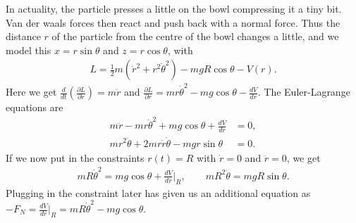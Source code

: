 In actuality, the particle presses a little on the bowl compressing it a tiny bit. Van der waals forces then react and push back with a normal force. Thus the distance $r$ of the particle from the centre of the bowl changes a little, and we model this $x = r \sin \theta$ and $z = r \cos \theta$, with
\begin{align}
    L = \frac{1}{2}m(\dot{r}^{2} + r^{2} \dot{\theta}^{2}) - mgR \cos \theta - V(r).
\end{align}
Here we get $\frac{d}{dt} \left( \frac{\partial L}{\partial \dot{r}} \right) = m\ddot{r}$ and $\frac{\partial L}{\partial r} = mr\dot{\theta}^{2} - mg\cos\theta - \frac{dV}{dr}$. The Euler-Lagrange equations are
\begin{align}
    m\ddot{r} - mr\dot{\theta}^{2} + mg\cos\theta + \frac{dV}{dr} &= 0,\\
    mr^{2}\ddot{\theta} + 2mr\dot{r}\dot{\theta} - mgr \sin \theta &= 0.
\end{align}
If we now put in the constraints $r(t) = R$ with $\dot{r} = 0$ and $\ddot{r} = 0$, we get
\begin{align}
    mR \dot{\theta}^{2} = mg \cos \theta + \frac{dV}{dr} \bigg|_{R}, \qquad mR^{2}\ddot{\theta} = mgR \sin \theta.
\end{align}
Plugging in the constraint later has given us an additional equation as $- F_{N} = \frac{dV}{dr} \big|_{R} = mR\dot{\theta}^{2} - mg \cos \theta$.
